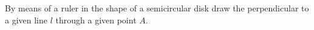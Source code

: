 By means of a ruler in the shape of a semicircular disk draw the perpendicular to a given line $l$ through a given point $A$.
